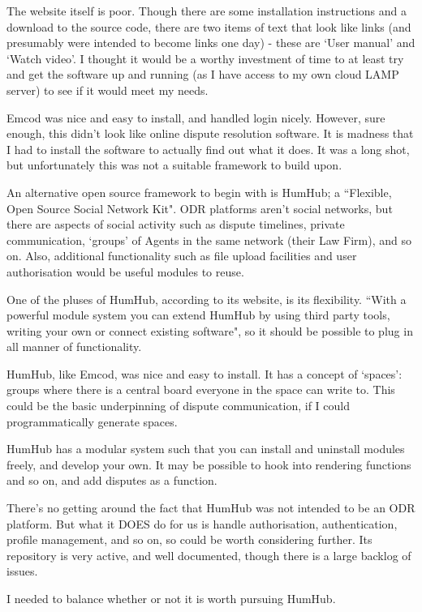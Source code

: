 The website itself is poor. Though there are some installation instructions and a download to the source code, there are two items of text that look like links (and presumably were intended to become links one day) - these are `User manual' and `Watch video'. I thought it would be a worthy investment of time to at least try and get the software up and running (as I have access to my own cloud LAMP server) to see if it would meet my needs.

Emcod was nice and easy to install, and handled login nicely. However, sure enough, this didn't look like online dispute resolution software. It is madness that I had to install the software to actually find out what it does. It was a long shot, but unfortunately this was not a suitable framework to build upon.

An alternative open source framework to begin with is HumHub; a ``Flexible, Open Source Social Network Kit". ODR platforms aren't social networks, but there are aspects of social activity such as dispute timelines, private communication, `groups' of Agents in the same network (their Law Firm), and so on. Also, additional functionality such as file upload facilities and user authorisation would be useful modules to reuse.

One of the pluses of HumHub, according to its website, is its flexibility. ``With a powerful module system you can extend HumHub by using third party tools, writing your own or connect existing software", so it should be possible to plug in all manner of functionality.

HumHub, like Emcod, was nice and easy to install. It has a concept of `spaces': groups where there is a central board everyone in the space can write to. This could be the basic underpinning of dispute communication, if I could programmatically generate spaces.

HumHub has a modular system such that you can install and uninstall modules freely, and develop your own. It may be possible to hook into rendering functions and so on, and add disputes as a function.

There's no getting around the fact that HumHub was not intended to be an ODR platform. But what it DOES do for us is handle authorisation, authentication, profile management, and so on, so could be worth considering further. Its repository is very active, and well documented, though there is a large backlog of issues.

I needed to balance whether or not it is worth pursuing HumHub.

